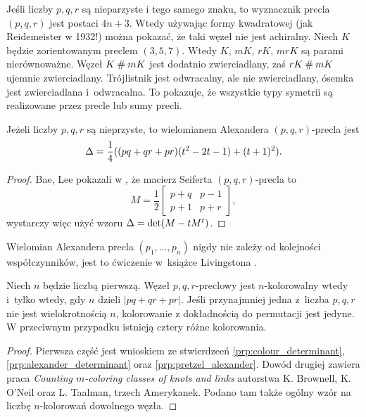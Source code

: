 Jeśli liczby $p, q, r$ są nieparzyste i tego samego znaku, to wyznacznik precla $(p, q, r)$ jest postaci $4n+3$.
%
Wtedy używając formy kwadratowej (jak Reidemeister w 1932!) można pokazać, że taki węzeł nie jest achiralny.
Niech $K$ będzie zorientowanym preclem $(3, 5, 7)$.
Wtedy $K$, $mK$, $rK$, $mrK$ są parami nierównoważne.
Węzeł $K \mathbin{\#} mK$ jest dodatnio zwierciadlany, zaś $rK \mathbin{\#} mK$ ujemnie zwierciadlany.
Trójlistnik jest odwracalny, ale nie zwierciadlany, ósemka jest zwierciadlana i~odwracalna.
To pokazuje, że wszystkie typy symetrii są realizowane przez precle lub sumy precli.

\begin{proposition}
\label{prp:pretzel_alexander}%
%
    Jeżeli liczby $p, q, r$ są nieprzyste, to wielomianem Alexandera $(p, q, r)$-precla jest
    \begin{equation}
        \Delta = \frac 14 ((pq+qr+pr) (t^2-2t-1) + (t+1)^2).
    \end{equation}
\end{proposition}

\begin{proof}
    Bae, Lee pokazali w \cite[lemat 3.1]{bae20}, że macierz Seiferta $(p, q, r)$-precla to
    \begin{equation}
        M = \frac 1 2 \begin{bmatrix}
            p+q & p-1 \\
            p+1 & p+r
        \end{bmatrix},
    \end{equation}
    wystarczy więc użyć wzoru $\Delta = \det(M-tM^t)$.
\end{proof}

Wielomian Alexandera precla $(p_1, \ldots, p_n)$ nigdy nie zależy od kolejności współczynników, jest to ćwiczenie w~książce Livingstona \cite[s. 215]{livingston93}.

\begin{proposition}
    Niech $n$ będzie liczbą pierwszą.
    Węzeł $p, q, r$-preclowy jest $n$-kolorowalny wtedy i~tylko wtedy, gdy $n$ dzieli $|pq+qr+pr|$.
    Jeśli przynajmniej jedna z~liczba $p, q, r$ nie jest wielokrotnością $n$, kolorowanie z dokładnością do permutacji jest jedyne.
    W przeciwnym przypadku istnieją cztery różne kolorowania.
%
\end{proposition}

\begin{proof}
    Pierwsza część jest wnioskiem ze stwierdzeeń \ref{prp:colour_determinant}, \ref{prp:alexander_determinant} oraz \ref{prp:pretzel_alexander}.
    Dowód drugiej zawiera praca \emph{Counting $m$-coloring classes of knots and links} autorstwa K. Brownell, K. O'Neil oraz L. Taalman, trzech Amerykanek.
    Podano tam także ogólny wzór na liczbę $n$-kolorowań dowolnego węzła.
\end{proof}

%


